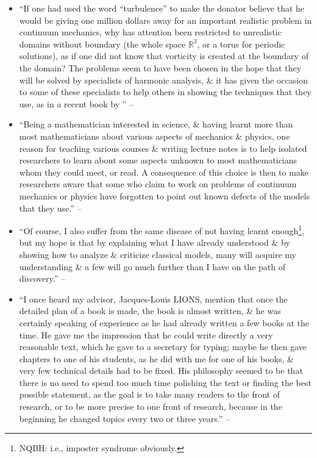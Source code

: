 \documentclass{article}
\begin{document}
\begin{enumerate}
\begin{itemize}
		\item ``If one had used the word ``turbulence'' to make the donator believe that he would be giving one million dollars away for an important realistic problem in continuum mechanics, why has attention been restricted to unrealistic domains without boundary (the whole space $\mathbb{R}^3$, or a torus for periodic solutions), as if one did not know that vorticity is created at the boundary of the domain? The problems seem to have been chosen in the hope that they will be solved by specialists of harmonic analysis, \& it has given the occasion to some of these specialists to help others in showing the techniques that they use, as in a recent book by \cite{Lemarie-Rieusset2016}'' -- \cite[Preface, p. viii]{Tartar2006}		
		\item ``Being a mathematician interested in science, \& having learnt more than most mathematicians about various aspects of mechanics \& physics, one reason for teaching various courses \& writing lecture notes is to help isolated researchers to learn about some aspects unknown to most mathematicians whom they could meet, or read. A consequence of this choice is then to make researchers aware that some who claim to work on problems of continuum mechanics or physics have forgotten to point out known defects of the models that they use.'' -- \cite[Preface, pp. viii--ix]{Tartar2006}
		\item ``Of course, I also suffer from the same disease of not having learnt enough\footnote{NQBH: i.e., imposter syndrome obviously.}, but my hope is that by explaining what I have already understood \& by showing how to analyze \& criticize classical models, many will acquire my understanding \& a few will go much further than I have on the path of discovery.'' -- \cite[Preface, p. ix]{Tartar2006}
		\item ``I once heard my advisor, Jacques-Louis LIONS, mention that once the detailed plan of a book is made, the book is almost written, \& he was certainly speaking of experience as he had already written a few books at the time. He gave me the impression that he could write directly a very reasonable text, which he gave to a secretary for typing; maybe he then gave chapters to one of his students, as he did with me for one of his books, \& very few technical details had to be fixed. His philosophy seemed to be that there is no need to spend too much time polishing the text or finding the best possible statement, as the goal is to take many readers to the front of research, or to be more precise to one front of research, because in the beginning he changed topics every two or three years.'' -- \cite[Preface, p. ix]{Tartar2006}

\end{itemize}
\end{enumerate}
\end{document}
